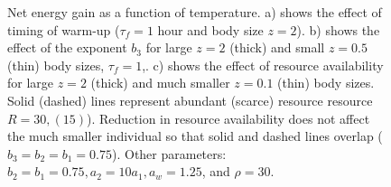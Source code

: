 \vspace{-0.8cm}
\begin{figure}%
\begin{center}
\caption{
	Net energy gain as a function of temperature.
	a) shows the effect of timing of warm-up ($\tau_f = 1$ hour and body size $z = 2$). %
	b) shows the effect of the exponent $b_3$  for large $z= 2$ (thick) and small $z = 0.5$ (thin) body sizes, $\tau_f = 1$,.
	c) shows the effect of resource availability for large $z = 2$ (thick) and much smaller $z = 0.1$ (thin) body sizes.
	Solid (dashed) lines represent abundant (scarce) resource resource $R = 30, (15)$).
	Reduction in resource availability does not affect the much smaller individual so that solid and dashed lines overlap ($b_3 = b_2 = b_1 = 0.75$).
	Other parameters: $ b_2 = b_1  = 0.75,  a_2 = 10 a_1, a_w = 1.25$, and  $\rho = 30$.
}%
\label{fig6}
\end{center}
\end{figure}
